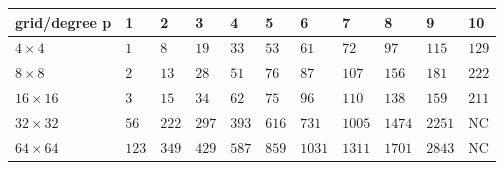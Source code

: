 \begin{tabular}{lllllllllll}
\hline
 grid/degree p   & 1     & 2     & 3     & 4     & 5     & 6      & 7      & 8      & 9      & 10    \\
\hline
 $4 \times 4$    & $1$   & $8$   & $19$  & $33$  & $53$  & $61$   & $72$   & $97$   & $115$  & $129$ \\
 $8 \times 8$    & $2$   & $13$  & $28$  & $51$  & $76$  & $87$   & $107$  & $156$  & $181$  & $222$ \\
 $16 \times 16$  & $3$   & $15$  & $34$  & $62$  & $75$  & $96$   & $110$  & $138$  & $159$  & $211$ \\
 $32 \times 32$  & $56$  & $222$ & $297$ & $393$ & $616$ & $731$  & $1005$ & $1474$ & $2251$ & NC    \\
 $64 \times 64$  & $123$ & $349$ & $429$ & $587$ & $859$ & $1031$ & $1311$ & $1701$ & $2843$ & NC    \\
\hline
\end{tabular}